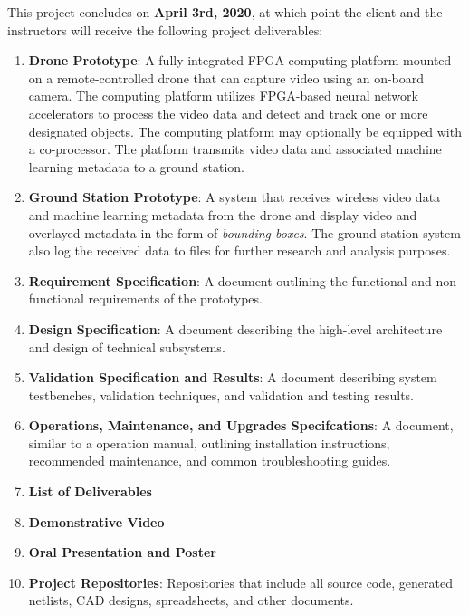 This project concludes on \textbf{April 3rd, 2020}, at which point the client
and the instructors will receive the following project deliverables:

\begin{enumerate}

\item \textbf{Drone Prototype}:
A fully integrated FPGA computing platform mounted on a remote-controlled
drone that can capture video using an on-board camera.
The computing platform utilizes FPGA-based neural network accelerators to 
process the video data and detect and track one or more designated objects.
The computing platform may optionally be equipped with a co-processor.
The platform transmits video data and associated machine learning metadata
to a ground station.

\item \textbf{Ground Station Prototype}:
A system that receives wireless video data and machine learning metadata from
the drone and display video and overlayed metadata in the form of 
\textit{bounding-boxes}. The ground station system also log the received data 
to files for further research and analysis purposes.

\item\textbf{Requirement Specification}:
A document outlining the functional and non-functional requirements
of the prototypes.

\item \textbf{Design Specification}:
A document describing the high-level architecture and design of technical subsystems.

\item \textbf{Validation Specification and Results}:
A document describing system testbenches, validation techniques, and validation
and testing results.

\item \textbf{Operations, Maintenance, and Upgrades Specifcations}:
A document, similar to a operation manual, outlining installation instructions,
recommended maintenance, and common troubleshooting guides.

\item \textbf{List of Deliverables}
\item \textbf{Demonstrative Video}
\item \textbf{Oral Presentation and Poster}
\item \textbf{Project Repositories}: Repositories that include all source code,
generated netlists, CAD designs, spreadsheets, and other documents.

\end{enumerate}